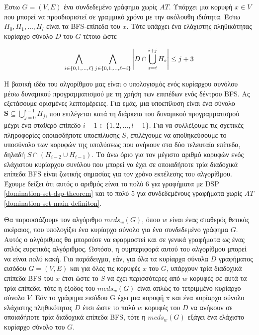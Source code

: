 \begin{theorem}
	\label{domination-set-main-definiton}
	Έστω $G = (V,E)$ ένα συνδεδεμένο γράφημα χωρίς $AT$. Υπάρχει μια κορυφή $x\in V$
	που μπορεί να προσδιοριστεί σε γραμμικό χρόνο με την ακόλουθη ιδιότητα. Έστω $H_0,H_1,\dots , H_l$
	είναι τα BFS-επίπεδα του $x$. Τότε υπάρχει ένα ελάχιστης πληθικότητας κυρίαρχο σύνολο $D$ του $G$ τέτοιο ώστε
\end{theorem}

\begin{center}
	\[
	\displaystyle \LARGE  \bigwedge_{i\in\{0,1,\ldots,\ell\}} \bigwedge_{j\in\{0,1,\ldots,\ell-i\}} \left|D\cap\bigcup_{s=i}^{i+j}H_{s}\right| \leq j+3
	\]
\end{center}

Η βασική ιδέα του αλγορίθμου μας είναι ο υπολογισμός ενός κυρίαρχου συνόλου μέσω δυναμικού προγραμματισμού με τη χρήση των επιπέδων ενός δέντρου BFS. Ας εξετάσουμε ορισμένες λεπτομέρειες. Για εμάς, μια υποεπίλυση είναι ένα σύνολο $\mathbf{S}\subseteq\bigcup_{j=0}^{i-1}H_{j}$, που επιλέγεται κατά τη διάρκεια του δυναμικού προγραμματισμού μέχρι ένα σταθερό επίπεδο \( i - 1 \in \{1, 2, \dots ,l-1\} \). Για να συλλέξουμε τις σχετικές πληροφορίες οποιασδήποτε υποεπίλυσης \( S \), επιλέγουμε να αποθηκεύσουμε το υποσύνολο των κορυφών της υπολύσεως που ανήκουν στα δύο τελευταία επίπεδα, δηλαδή \( S \cap (H_{i-2} \cup H_{i-1}) \). Το άνω όριο για τον μέγιστο αριθμό κορυφών ενός ελάχιστου κυρίαρχου συνόλου που μπορεί να έχει σε οποιαδήποτε τρία διαδοχικά επίπεδα BFS είναι ζωτικής σημασίας για τον χρόνο εκτέλεσης του αλγορίθμου. Έχουμε δείξει ότι αυτός ο αριθμός είναι το πολύ 6 για γραφήματα με DSP \ref{domination-set-dsp-theorem}  και το πολύ 5 για συνδεδεμένους γραφήματα χωρίς \(AT\) \ref{domination-set-main-definiton}.


Θα παρουσιάζουμε τον αλγόριθμο $mcds_w(G)$, όπου $w$ είναι ένας σταθερός θετικός ακέραιος, που υπολογίζει ένα κυρίαρχο σύνολο για ένα συνδεδεμένο γράφημα $G$. Αυτός ο αλγόριθμος θα μπορούσε να εφαρμοστεί και σε γενικά γραφήματα ως ένας απλός ευρετικός αλγόριθμος. Ωστόσο, η συμπεριφορά αυτού του αλγορίθμου μπορεί να είναι πολύ κακή. Για παράδειγμα, εάν, για όλα τα κυρίαρχα σύνολα $D$ γραφήματος εισόδου $G = (V, E)$ και για όλες τις κορυφές $x$ του $G$, υπάρχουν τρία διαδοχικά επίπεδα BFS του $x$ έτσι ώστε το $S$ να έχει περισσότερες από $w$ κορυφές σε αυτά τα τρία επίπεδα, τότε η έξοδος του $mcds_w(G)$ είναι απλώς το τετριμμένο κυρίαρχο σύνολο $V$. Εάν το γράφημα εισόδου G έχει μια κορυφή x και ένα κυρίαρχο σύνολο ελάχιστης πληθικότητας $D$ έτσι ώστε το πολύ $w$ κορυφές του $D$ να ανήκουν σε οποιαδήποτε τρία διαδοχικά επίπεδα BFS, τότε η $mcds_w(G)$ εξάγει ένα ελάχιστο κυρίαρχο σύνολο του $G$.


